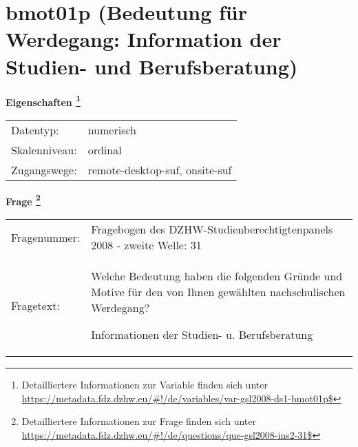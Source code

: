 
    \setcounter{footnote}{0}

    \vspace*{-1.8cm}
	\section{bmot01p (Bedeutung für Werdegang: Information der Studien- und Berufsberatung)}
	\label{section:bmot01p}



    \vspace*{0.5cm}
    \noindent\textbf{Eigenschaften
	\footnote{Detailliertere Informationen zur Variable finden sich unter
		\url{https://metadata.fdz.dzhw.eu/\#!/de/variables/var-gsl2008-ds1-bmot01p$}}}\\
	\begin{tabularx}{\hsize}{@{}lX}
	Datentyp: & numerisch \\
	Skalenniveau: & ordinal \\
	Zugangswege: &
	  remote-desktop-suf, 
	  onsite-suf
 \\
    \end{tabularx}



				\vspace*{0.5cm}
                \noindent\textbf{Frage
	                \footnote{Detailliertere Informationen zur Frage finden sich unter
		              \url{https://metadata.fdz.dzhw.eu/\#!/de/questions/que-gsl2008-ins2-31$}}}\\
				\begin{tabularx}{\hsize}{@{}lX}
					Fragenummer: &
					  Fragebogen des DZHW-Studienberechtigtenpanels 2008 - zweite Welle:
					  31
 \\
					Fragetext: & Welche Bedeutung haben die folgenden Gründe und Motive für den von Ihnen gewählten nachschulischen Werdegang?\par  Informationen der Studien- u. Berufsberatung \\
				\end{tabularx}





